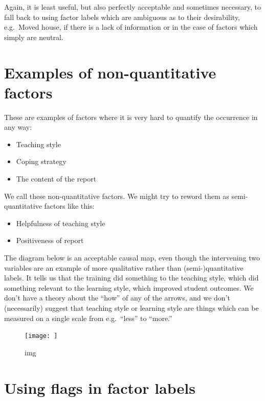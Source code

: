 \documentclass[
]{book}
\providecommand{\tightlist}{%
  \setlength{\itemsep}{0pt}\setlength{\parskip}{0pt}}
\begin{document}
Again, it is least useful, but also perfectly acceptable and sometimes necessary, to fall back to using factor labels which are ambiguous as to their desirability, e.g.~Moved house\emph{,} if there is a lack of information or in the case of factors which simply are neutral.

\hypertarget{examples-of-non-quantitative-factors}{%
\section{Examples of non-quantitative factors}\label{examples-of-non-quantitative-factors}}

These are examples of factors where it is very hard to quantify the occurrence in any way:

\begin{itemize}
\tightlist
\item
  Teaching style
\item
  Coping strategy
\item
  The content of the report
\end{itemize}

We call these non-quantitative factors. We might try to reword them as semi-quantitative factors like this:

\begin{itemize}
\tightlist
\item
  Helpfulness of teaching style
\item
  Positiveness of report
\end{itemize}

The diagram below is an acceptable causal map, even though the intervening two variables are an example of more qualitative rather than (semi-)quantitative labels. It tells us that the training did something to the teaching style, which did something relevant to the learning style, which improved student outcomes. We don't have a theory about the ``how'' of any of the arrows, and we don't (necessarily) suggest that teaching style or learning style are things which can be measured on a single scale from e.g.~``less'' to ``more.''

\begin{figure}
\centering
\texttt{[image: ]}
\caption{img}
\end{figure}

\hypertarget{using-flags-in-factor-labels}{%
\section{Using flags in factor labels}\label{using-flags-in-factor-labels}}
\end{document}
